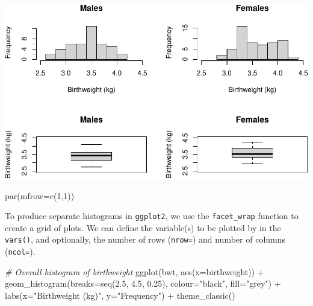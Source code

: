 \documentclass[
]{memoir}
\newenvironment{Shaded}{\begin{snugshade}}{\end{snugshade}}
\newcommand{\AttributeTok}[1]{\textcolor[rgb]{0.77,0.63,0.00}{#1}}
\newcommand{\CommentTok}[1]{\textcolor[rgb]{0.56,0.35,0.01}{\textit{#1}}}
\newcommand{\DecValTok}[1]{\textcolor[rgb]{0.00,0.00,0.81}{#1}}
\newcommand{\FloatTok}[1]{\textcolor[rgb]{0.00,0.00,0.81}{#1}}
\newcommand{\FunctionTok}[1]{\textcolor[rgb]{0.00,0.00,0.00}{#1}}
\newcommand{\NormalTok}[1]{#1}
\newcommand{\SpecialCharTok}[1]{\textcolor[rgb]{0.00,0.00,0.00}{#1}}
\newcommand{\StringTok}[1]{\textcolor[rgb]{0.31,0.60,0.02}{#1}}
\begin{document}
\includegraphics{05.1-Means-R_files/figure-latex/unnamed-chunk-3-1.pdf}

\begin{Shaded}
\begin{Highlighting}[]
\FunctionTok{par}\NormalTok{(}\AttributeTok{mfrow=}\FunctionTok{c}\NormalTok{(}\DecValTok{1}\NormalTok{,}\DecValTok{1}\NormalTok{))}
\end{Highlighting}
\end{Shaded}

To produce separate histograms in \texttt{ggplot2}, we use the \texttt{facet\_wrap} function to create a grid of plots. We can define the variable(s) to be plotted by in the \texttt{vars()}, and optionally, the number of rows (\texttt{nrow=}) and number of columns (\texttt{ncol=}).

\begin{Shaded}
\begin{Highlighting}[]
\CommentTok{\# Overall histogram of birthweight}
\FunctionTok{ggplot}\NormalTok{(bwt, }\FunctionTok{aes}\NormalTok{(}\AttributeTok{x=}\NormalTok{birthweight)) }\SpecialCharTok{+} 
  \FunctionTok{geom\_histogram}\NormalTok{(}\AttributeTok{breaks=}\FunctionTok{seq}\NormalTok{(}\FloatTok{2.5}\NormalTok{, }\FloatTok{4.5}\NormalTok{, }\FloatTok{0.25}\NormalTok{), }\AttributeTok{colour=}\StringTok{"black"}\NormalTok{, }\AttributeTok{fill=}\StringTok{"grey"}\NormalTok{) }\SpecialCharTok{+} 
  \FunctionTok{labs}\NormalTok{(}\AttributeTok{x=}\StringTok{"Birthweight (kg)"}\NormalTok{, }\AttributeTok{y=}\StringTok{"Frequency"}\NormalTok{) }\SpecialCharTok{+}
  \FunctionTok{theme\_classic}\NormalTok{()}
\end{Highlighting}
\end{Shaded}
\end{document}
